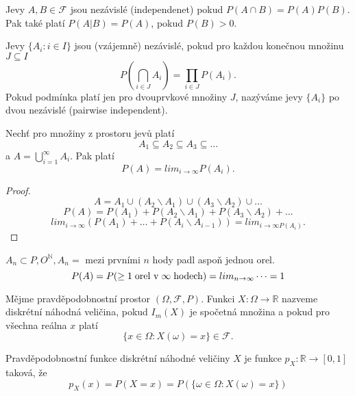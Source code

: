 \documentclass[../main.tex]{subfiles}
\begin{document}
\begin{definition}
    Jevy $A,B \in \mathcal{F}$ jsou nezávislé (independenet) pokud $P(A\cap B) = P(A)P(B)$.\\
    Pak také platí $P(A|B) = P(A)$, pokud $P(B)>0$.
\end{definition}

\begin{definition}
    Jevy $\{A_i : i \in I\}$ jsou (vzájemně) nezávislé, pokud pro každou konečnou množinu $J \subseteq I$
    \[P\left(\bigcap_{i\in J} A_i\right) = \prod_{i\in J} P(A_i).\]
    Pokud podmínka platí jen pro dvouprvkové množiny $J$, nazýváme jevy $\{A_i\}$ po dvou nezávislé (pairwise independent).
\end{definition}

\begin{definition}
    Nechť pro množiny z prostoru jevů platí
    \[A_1 \subseteq A_2 \subseteq A_3 \subseteq \dots\]
    a $A = \bigcup^\infty_{i=1}A_i$. Pak platí
    \[P(A) = lim_{i\rightarrow \infty} P(A_i).\]
    \begin{proof}
        \[A = A_1 \cup (A_2\backslash A_1)\cup (A_3\backslash A_2) \cup \dots\]
        \[P(A) = P(A_1) + P(A_2\backslash A_1) + P(A_3\backslash A_2) + \dots\]
        \[lim_{i\rightarrow \infty} (P(A_1) + \dots + P(A_i \backslash A_{i-1})) = lim_{i\rightarrow \infty P(A_i)}.\]
    \end{proof}
 
    $A_n \subset {P,O}^\mathbb{N}, A_n = $ mezi prvními $n$ hody padl aspoň jednou orel.
    \[P(A) = P(\geq 1 \hspace{1mm} \text{orel v} \hspace{1mm} \infty \hspace{1mm} \text{hodech}) = lim_{n\rightarrow \infty} \dots = 1\]
\end{definition}

\begin{definition}
    Mějme pravděpodobnostní prostor $(\Omega, \mathcal{F}, P).$ Funkci $X : \Omega \rightarrow \mathbb{R}$
    nazveme diskrétní náhodná veličina, pokud $I_m(X)$ je spočetná množina a pokud pro všechna reálna $x$ platí
    \[\{x \in \Omega : X(\omega) = x\} \in \mathcal{F}.\]
\end{definition}

\begin{definition}
    Pravděpodobnostní funkce diskrétní náhodné veličiny $X$ je funkce $p_X : \mathbb{R} \rightarrow [0,1]$ taková, že 
    \[p_X(x) = P(X = x) = P(\{\omega \in \Omega : X(\omega) = x\})\]
\end{definition}
\end{document}
